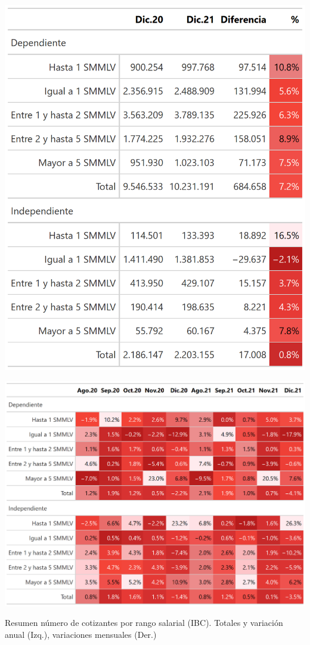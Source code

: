 \begin{table}[!h]
\centering
\begin{minipage}{0.5\textwidth}
  \centering
  \includegraphics[width=0.6\linewidth]{results/01_dinamica/salida_total_cotizantes.png}
\end{minipage}%
\begin{minipage}{0.5\textwidth}
  \centering
  \includegraphics[width=\linewidth]{results/01_dinamica/salida_total_cotizantes_variaciones.png}
\end{minipage}
\caption{
Resumen número de cotizantes por rango salarial (IBC). Totales y variación anual (Izq.), variaciones mensuales (Der.)
}

\label{tabla:resumen:cotizantes_rangoIBC}
\end{table}

